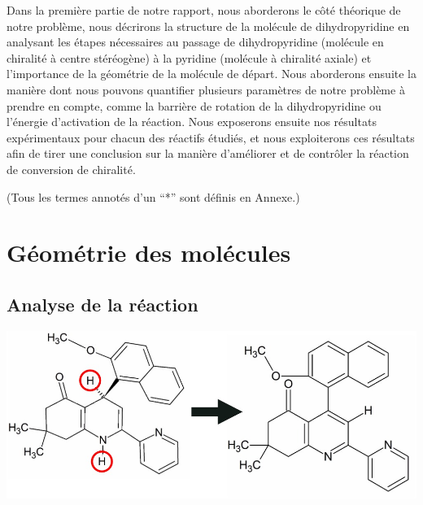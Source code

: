 \documentclass{article}
\begin{document}
\bigbreak
Dans la première partie de notre rapport, nous aborderons le côté théorique de notre problème, nous décrirons la structure de la molécule de dihydropyridine en analysant les étapes nécessaires au passage de dihydropyridine (molécule en chiralité à centre stéréogène) à la pyridine (molécule à chiralité axiale) et l’importance de la géométrie de la molécule de départ. Nous aborderons ensuite la manière dont nous pouvons quantifier plusieurs paramètres de notre problème à prendre en compte, comme la barrière de rotation de la dihydropyridine ou l'énergie d’activation de la réaction. Nous exposerons ensuite nos résultats expérimentaux pour chacun des réactifs étudiés, et nous exploiterons ces résultats afin de tirer une conclusion sur la manière d’améliorer et de contrôler la réaction de conversion de chiralité.

\newpage

\tableofcontents
\bigbreak
\bigbreak
\bigbreak
(Tous les termes annotés d’un “*” sont définis en Annexe.)

\newpage
\section{Géométrie des molécules}

\medbreak
\par
\subsection{Analyse de la réaction}


\begin{center}
\includegraphics[scale = 0.3]{a}
\end{center}
\end{document}

